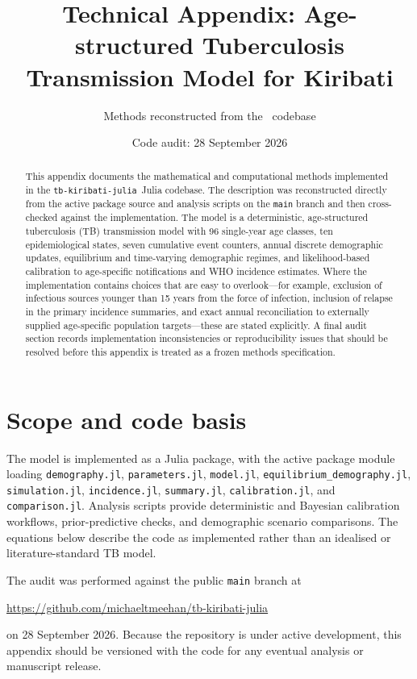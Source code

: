 \documentclass[11pt]{article}
\title{Technical Appendix: Age-structured Tuberculosis Transmission Model for Kiribati}
\author{Methods reconstructed from the \repo\ codebase}
\date{Code audit: 28 September 2026}
\newcommand{\repo}{\texttt{tb-kiribati-julia}}
\newcommand{\code}[1]{\texttt{#1}}
\begin{document}
\maketitle

\begin{abstract}
This appendix documents the mathematical and computational methods implemented in the \repo\ Julia codebase. The description was reconstructed directly from the active package source and analysis scripts on the \code{main} branch and then cross-checked against the implementation. The model is a deterministic, age-structured tuberculosis (TB) transmission model with 96 single-year age classes, ten epidemiological states, seven cumulative event counters, annual discrete demographic updates, equilibrium and time-varying demographic regimes, and likelihood-based calibration to age-specific notifications and WHO incidence estimates. Where the implementation contains choices that are easy to overlook---for example, exclusion of infectious sources younger than 15 years from the force of infection, inclusion of relapse in the primary incidence summaries, and exact annual reconciliation to externally supplied age-specific population targets---these are stated explicitly. A final audit section records implementation inconsistencies or reproducibility issues that should be resolved before this appendix is treated as a frozen methods specification.
\end{abstract}

\tableofcontents
\clearpage

\section{Scope and code basis}

The model is implemented as a Julia package, with the active package module loading \code{demography.jl}, \code{parameters.jl}, \code{model.jl}, \code{equilibrium\_demography.jl}, \code{simulation.jl}, \code{incidence.jl}, \code{summary.jl}, \code{calibration.jl}, and \code{comparison.jl}. Analysis scripts provide deterministic and Bayesian calibration workflows, prior-predictive checks, and demographic scenario comparisons. The equations below describe the code as implemented rather than an idealised or literature-standard TB model.

The audit was performed against the public \code{main} branch at
\begin{center}
\url{https://github.com/michaeltmeehan/tb-kiribati-julia}
\end{center}
on 28 September 2026. Because the repository is under active development, this appendix should be versioned with the code for any eventual analysis or manuscript release.
\end{document}
